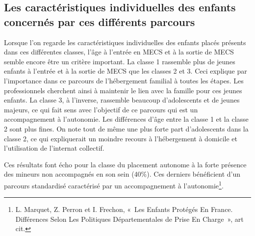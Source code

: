 \documentclass[
  12,
  a4paper,
]{report}
\begin{document}
\hypertarget{les-caractuxe9ristiques-individuelles-des-enfants-concernuxe9s-par-ces-diffuxe9rents-parcours}{%
\subsection{Les caractéristiques individuelles des enfants concernés par
ces différents
parcours}\label{les-caractuxe9ristiques-individuelles-des-enfants-concernuxe9s-par-ces-diffuxe9rents-parcours}}

Lorsque l'on regarde les caractéristiques individuelles des enfants
placés présents dans ces différentes classes, l'âge à l'entrée en MECS
et à la sortie de MECS semble encore être un critère important. La
classe 1 rassemble plus de jeunes enfants à l'entrée et à la sortie de
MECS que les classes 2 et 3. Ceci explique par l'importance dans ce
parcours de l'hébergement familial à toutes les étapes. Les
professionnels cherchent ainsi à maintenir le lien avec la famille pour
ces jeunes enfants. La classe 3, à l'inverse, rassemble beaucoup
d'adolescents et de jeunes majeurs, ce qui fait sens avec l'objectif de
ce parcours qui est un accompagnement à l'autonomie. Les différences
d'âge entre la classe 1 et la classe 2 sont plus fines. On note tout de
même une plus forte part d'adolescents dans la classe 2, ce qui
expliquerait un moindre recours à l'hébergement à domicile et
l'utilisation de l'internat collectif.

Ces résultats font écho pour la classe du placement autonome à la forte
présence des mineurs non accompagnés en son sein (40\%). Ces derniers
bénéficient d'un parcours standardisé caractérisé par un accompagnement
à l'autonomie\footnote{L. Marquet, Z. Perron et I. Frechon, {«~Les
  Enfants Protégés En {France}. {Différences} Selon Les Politiques
  Départementales de Prise En Charge~»}, art cit.}.
\end{document}
